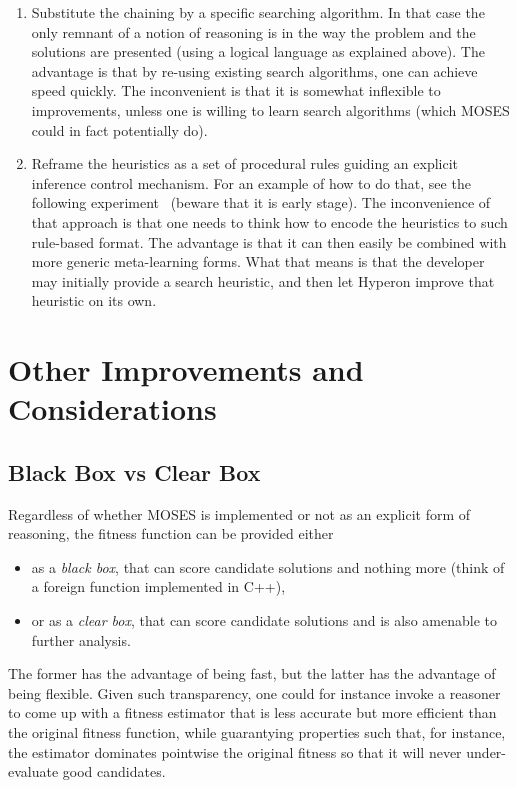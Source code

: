 \documentclass[]{report}
\begin{document}
\begin{enumerate}
\begin{enumerate}
   \item Substitute the chaining by a specific searching algorithm.
     In that case the only remnant of a notion of reasoning is in the
     way the problem and the solutions are presented (using a logical
     language as explained above).  The advantage is that by re-using
     existing search algorithms, one can achieve speed quickly.  The
     inconvenient is that it is somewhat inflexible to improvements,
     unless one is willing to learn search algorithms (which MOSES
     could in fact potentially do).
   \item Reframe the heuristics as a set of procedural rules guiding
     an explicit inference control mechanism.  For an example of how
     to do that, see the following experiment~\cite{InfControl}
     (beware that it is early stage).  The inconvenience of that
     approach is that one needs to think how to encode the heuristics
     to such rule-based format.  The advantage is that it can then
     easily be combined with more generic meta-learning forms.  What
     that means is that the developer may initially provide a search
     heuristic, and then let Hyperon improve that heuristic on its
     own.
   \end{enumerate}
\end{enumerate}

\section{Other Improvements and Considerations}

\subsection{Black Box vs Clear Box}
\label{sec:blackbox-clearbox}

Regardless of whether MOSES is implemented or not as an explicit form
of reasoning, the fitness function can be provided either
\begin{itemize}
\item as a \emph{black box}, that can score candidate solutions and
  nothing more (think of a foreign function implemented in C++),
\item or as a \emph{clear box}, that can score candidate solutions and
  is also amenable to further analysis.
\end{itemize}
The former has the advantage of being fast, but the latter has the
advantage of being flexible.  Given such transparency, one could for
instance invoke a reasoner to come up with a fitness estimator that is
less accurate but more efficient than the original fitness function,
while guarantying properties such that, for instance, the estimator
dominates pointwise the original fitness so that it will never
under-evaluate good candidates.
\end{document}
